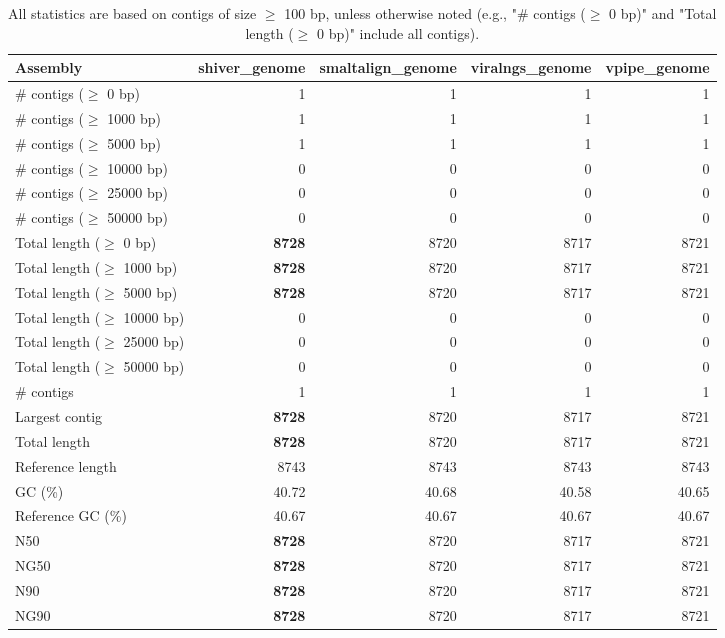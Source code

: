 \documentclass[12pt,a4paper]{article}
\begin{document}
\begin{table}[ht]
\begin{center}
\caption{All statistics are based on contigs of size $\geq$ 100 bp, unless otherwise noted (e.g., "\# contigs ($\geq$ 0 bp)" and "Total length ($\geq$ 0 bp)" include all contigs).}
\begin{tabular}{|l*{4}{|r}|}
\hline
Assembly & shiver\_genome & smaltalign\_genome & viralngs\_genome & vpipe\_genome \\ \hline
\# contigs ($\geq$ 0 bp) & 1 & 1 & 1 & 1 \\ \hline
\# contigs ($\geq$ 1000 bp) & 1 & 1 & 1 & 1 \\ \hline
\# contigs ($\geq$ 5000 bp) & 1 & 1 & 1 & 1 \\ \hline
\# contigs ($\geq$ 10000 bp) & 0 & 0 & 0 & 0 \\ \hline
\# contigs ($\geq$ 25000 bp) & 0 & 0 & 0 & 0 \\ \hline
\# contigs ($\geq$ 50000 bp) & 0 & 0 & 0 & 0 \\ \hline
Total length ($\geq$ 0 bp) & {\bf 8728} & 8720 & 8717 & 8721 \\ \hline
Total length ($\geq$ 1000 bp) & {\bf 8728} & 8720 & 8717 & 8721 \\ \hline
Total length ($\geq$ 5000 bp) & {\bf 8728} & 8720 & 8717 & 8721 \\ \hline
Total length ($\geq$ 10000 bp) & 0 & 0 & 0 & 0 \\ \hline
Total length ($\geq$ 25000 bp) & 0 & 0 & 0 & 0 \\ \hline
Total length ($\geq$ 50000 bp) & 0 & 0 & 0 & 0 \\ \hline
\# contigs & 1 & 1 & 1 & 1 \\ \hline
Largest contig & {\bf 8728} & 8720 & 8717 & 8721 \\ \hline
Total length & {\bf 8728} & 8720 & 8717 & 8721 \\ \hline
Reference length & 8743 & 8743 & 8743 & 8743 \\ \hline
GC (\%) & 40.72 & 40.68 & 40.58 & 40.65 \\ \hline
Reference GC (\%) & 40.67 & 40.67 & 40.67 & 40.67 \\ \hline
N50 & {\bf 8728} & 8720 & 8717 & 8721 \\ \hline
NG50 & {\bf 8728} & 8720 & 8717 & 8721 \\ \hline
N90 & {\bf 8728} & 8720 & 8717 & 8721 \\ \hline
NG90 & {\bf 8728} & 8720 & 8717 & 8721 \\ \hline

\end{tabular}
\end{center}
\end{table}
\end{document}
